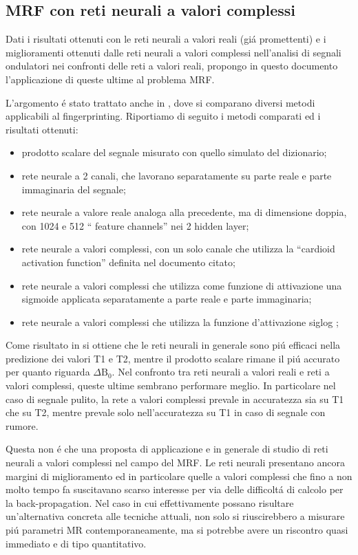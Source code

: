 \documentclass[a4paper,10pt]{article}
\begin{document}
 
 
 \subsection{MRF con reti neurali a valori complessi}
 
 Dati i risultati ottenuti con le reti neurali a valori reali (gi\'a promettenti) e i miglioramenti ottenuti dalle reti neurali a valori complessi nell'analisi di segnali ondulatori nei confronti delle reti a valori reali, propongo in questo documento l'applicazione di queste ultime al problema MRF.
 
 L'argomento \'e stato trattato anche in \cite{virtue2017better}, dove si comparano diversi metodi applicabili al fingerprinting. Riportiamo di seguito i metodi comparati ed i risultati ottenuti:
 \begin{itemize}
  \item prodotto scalare del segnale misurato con quello simulato del dizionario;
  \item rete neurale a 2 canali, che lavorano separatamente su parte reale e parte immaginaria del segnale;
  \item rete neurale a valore reale analoga alla precedente, ma di dimensione doppia, con 1024 e 512 `` feature channels'' nei 2 hidden layer;
  \item rete neurale a valori complessi, con un solo canale che utilizza la ``cardioid activation function'' definita nel documento citato;
  \item rete neurale a valori complessi che utilizza come funzione di attivazione una sigmoide applicata separatamente a parte reale e parte immaginaria;
  \item rete neurale a valori complessi che utilizza la funzione d'attivazione siglog \cite{georgiou1992complex};
 \end{itemize}

 Come risultato in \cite{virtue2017better} si ottiene che le reti neurali in generale sono pi\'u efficaci nella predizione dei valori T1 e T2, mentre il prodotto scalare rimane il pi\'u accurato per quanto riguarda $\Delta\mbox{B}_0$. Nel confronto tra reti neurali a valori reali e reti a valori complessi, queste ultime sembrano performare meglio. In particolare nel caso di segnale pulito, la rete a valori complessi prevale in accuratezza sia su T1 che su T2, mentre prevale solo nell'accuratezza su T1 in caso di segnale con rumore.
 
 Questa non \'e che una proposta di applicazione e in generale di studio di reti neurali a valori complessi nel campo del MRF. Le reti neurali presentano ancora margini di miglioramento ed in particolare quelle a valori complessi che fino a non molto tempo fa suscitavano scarso interesse per via delle difficolt\'a di calcolo per la back-propagation. Nel caso in cui effettivamente possano risultare un'alternativa concreta alle tecniche attuali, non solo si riuscirebbero a misurare pi\'u parametri MR contemporaneamente, ma si potrebbe avere un riscontro quasi immediato e di tipo quantitativo.
 
 
 
 \printbibliography
 
\end{document}
